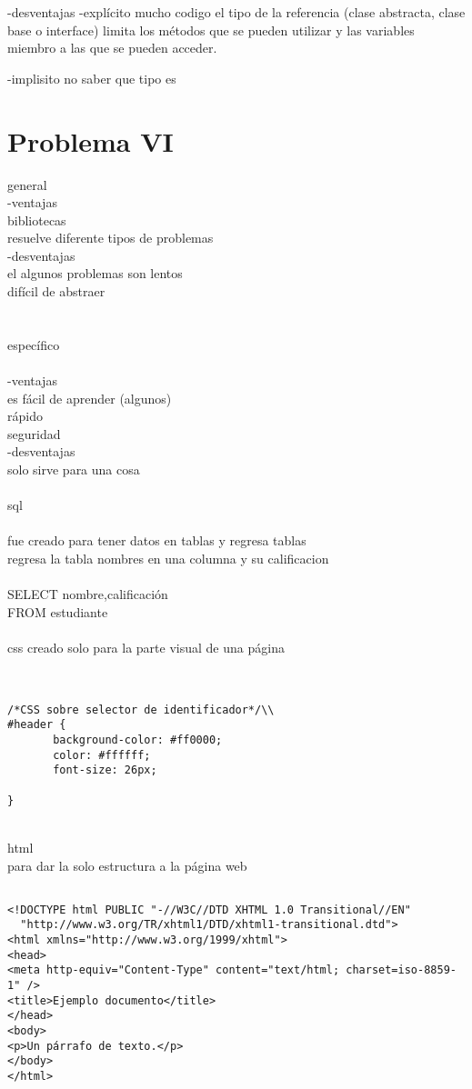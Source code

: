 \documentclass{article}
\begin{document}
-desventajas
-explícito
mucho codigo 
el tipo de la referencia (clase abstracta, clase base o interface) limita los métodos que se pueden utilizar y las variables miembro a las que se pueden acceder.

-implisito
no saber que tipo es 




\section{Problema VI}
general \\
-ventajas\\
bibliotecas\\ 
resuelve diferente tipos de problemas \\
-desventajas\\
el algunos problemas son lentos\\
difícil de abstraer \\
\\
\\

específico\\
\\
-ventajas\\
 es fácil de aprender (algunos)\\
 rápido \\
seguridad \\
-desventajas\\
solo sirve para una cosa\\
\\

sql\\
\\
fue creado para tener datos en tablas y regresa tablas\\
regresa la tabla nombres en una columna y su calificacion
\\
\\
SELECT nombre,calificación\\
FROM estudiante\\
\\
css creado solo para la parte visual de una página\\
\\
\begin{verbatim}

/*CSS sobre selector de identificador*/\\
#header {
       background-color: #ff0000;
       color: #ffffff;
       font-size: 26px;
       
}
\end{verbatim}
\\html \\
para dar la solo estructura a la página web 
\\
 \begin{verbatim}

<!DOCTYPE html PUBLIC "-//W3C//DTD XHTML 1.0 Transitional//EN"
  "http://www.w3.org/TR/xhtml1/DTD/xhtml1-transitional.dtd">
<html xmlns="http://www.w3.org/1999/xhtml">
<head>
<meta http-equiv="Content-Type" content="text/html; charset=iso-8859-1" />
<title>Ejemplo documento</title>
</head>
<body>
<p>Un párrafo de texto.</p>
</body>
</html>

\end{verbatim}
\end{document}
